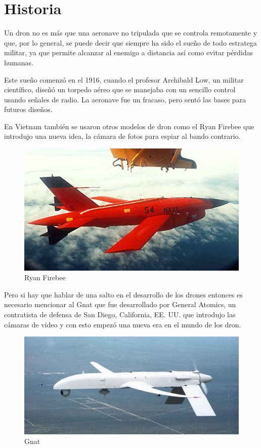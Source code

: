 \section{Historia}
\label{sec:historia}

Un dron no es más que una aeronave no tripulada que se controla remotamente y que, por lo general, se puede decir que siempre ha sido el sueño de todo estratega militar, ya que permite alcanzar al enemigo a distancia así como evitar pérdidas humanas.

Este sueño comenzó en el 1916, cuando el profesor Archibald Low, un militar científico, diseñó un torpedo aéreo que se manejaba con un sencillo control usando señales de radio. La aeronave fue un fracaso, pero sentó las bases para futuros diseños.

En Vietnam también se usaron otros modelos de dron como el Ryan Firebee que introdujo una nueva idea, la cámara de fotos para espiar al bando contrario.

\begin{figure}[H]
  \centering
  \includegraphics[scale=0.65]{imagenes/ryanfirebee.jpg}
  \caption{Ryan Firebee}
  \label{fig:ryanfirebee}
\end{figure}

Pero si hay que hablar de una salto en el desarrollo de los drones entonces es necesario mencionar al Gnat que fue desarrollado por General Atomics, un contratista de defensa de San Diego, California, EE. UU. que introdujo las cámaras de video y con esto empezó una nueva era en el mundo de los dron.

\begin{figure}[H]
  \centering
  \includegraphics[scale=0.4]{imagenes/gnat.jpg}
  \caption{Gnat}
  \label{fig:gnat}
\end{figure}

